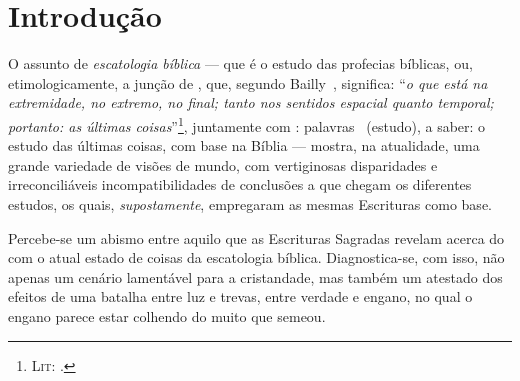 \setlength{\parskip}{0.5\baselineskip}



\section{Introdução}

    O assunto de \emph{escatologia bíblica} --- que é o estudo  das  profecias  bíblicas,  ou,  etimologicamente,  a  junção  de
    ,  que,  segundo  Bailly~\cite[pp.~817--8]{2000-BaillyA-Hachette},  significa:  ``\textit{o   que   está   na
    extremidade,  no  extremo,   no   final;   tanto   nos   sentidos   espacial   quanto   temporal;   portanto:   as   últimas
    coisas\/}''\footnote{\textsc{Lit}: .},    juntamente    com    :
    palavras~\cite{1997-ManiatoglouMPF-Porto} (estudo), a saber: o estudo das últimas coisas, com base na Bíblia --- mostra,  na
    atualidade, uma grande variedade de visões de mundo, com vertiginosas disparidades e irreconciliáveis incompatibilidades  de
    conclusões a que chegam os diferentes estudos, os quais, \emph{supostamente}, empregaram as mesmas Escrituras como base.

    Percebe-se  um  abismo  entre   aquilo   que   as   Escrituras   Sagradas   revelam   acerca   do    com o atual estado de coisas da escatologia bíblica. Di\-a\-gnos\-ti\-ca-se, com isso, não  apenas
    um cenário lamentável para a cristandade, mas também um atestado dos efeitos de  uma  batalha  entre  luz  e  trevas,  entre
    verdade e engano, no qual o engano parece estar colhendo do muito que semeou.

